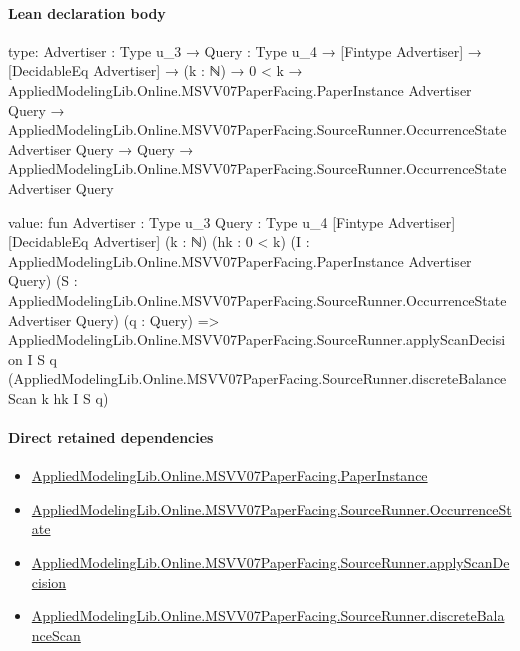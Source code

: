 \documentclass[10pt]{article}
\begin{document}
\paragraph{Lean declaration body}
\begin{ReviewVerbatim}
type:
{Advertiser : Type u_3} →
  {Query : Type u_4} →
    [Fintype Advertiser] →
      [DecidableEq Advertiser] →
        (k : ℕ) →
          0 < k →
            AppliedModelingLib.Online.MSVV07PaperFacing.PaperInstance Advertiser Query →
              AppliedModelingLib.Online.MSVV07PaperFacing.SourceRunner.OccurrenceState Advertiser Query →
                Query → AppliedModelingLib.Online.MSVV07PaperFacing.SourceRunner.OccurrenceState Advertiser Query

value:
fun {Advertiser : Type u_3} {Query : Type u_4} [Fintype Advertiser] [DecidableEq Advertiser] (k : ℕ) (hk : 0 < k)
    (I : AppliedModelingLib.Online.MSVV07PaperFacing.PaperInstance Advertiser Query)
    (S : AppliedModelingLib.Online.MSVV07PaperFacing.SourceRunner.OccurrenceState Advertiser Query) (q : Query) =>
  AppliedModelingLib.Online.MSVV07PaperFacing.SourceRunner.applyScanDecision I S q
    (AppliedModelingLib.Online.MSVV07PaperFacing.SourceRunner.discreteBalanceScan k hk I S q)
\end{ReviewVerbatim}

\paragraph{Direct retained dependencies}
\begin{itemize}\raggedright
\item \hyperlink{governing-declaration-11907576ec71eeb5}{Applied\allowbreak{}Modeling\allowbreak{}Lib.\allowbreak{}Online.\allowbreak{}MSVV07\allowbreak{}Paper\allowbreak{}Facing.\allowbreak{}Paper\allowbreak{}Instance}
\item \hyperlink{governing-declaration-2eff7815f49c1d41}{Applied\allowbreak{}Modeling\allowbreak{}Lib.\allowbreak{}Online.\allowbreak{}MSVV07\allowbreak{}Paper\allowbreak{}Facing.\allowbreak{}Source\allowbreak{}Runner.\allowbreak{}Occurrence\allowbreak{}State}
\item \hyperlink{governing-declaration-630634ffcb66c6e1}{Applied\allowbreak{}Modeling\allowbreak{}Lib.\allowbreak{}Online.\allowbreak{}MSVV07\allowbreak{}Paper\allowbreak{}Facing.\allowbreak{}Source\allowbreak{}Runner.\allowbreak{}apply\allowbreak{}Scan\allowbreak{}Decision}
\item \hyperlink{paper-prerequisite-67f443bf0ff68608}{Applied\allowbreak{}Modeling\allowbreak{}Lib.\allowbreak{}Online.\allowbreak{}MSVV07\allowbreak{}Paper\allowbreak{}Facing.\allowbreak{}Source\allowbreak{}Runner.\allowbreak{}discrete\allowbreak{}Balance\allowbreak{}Scan}
\end{itemize}
\hypertarget{governing-declaration-a1384cbd1c9eb5e4}{}
\end{document}
